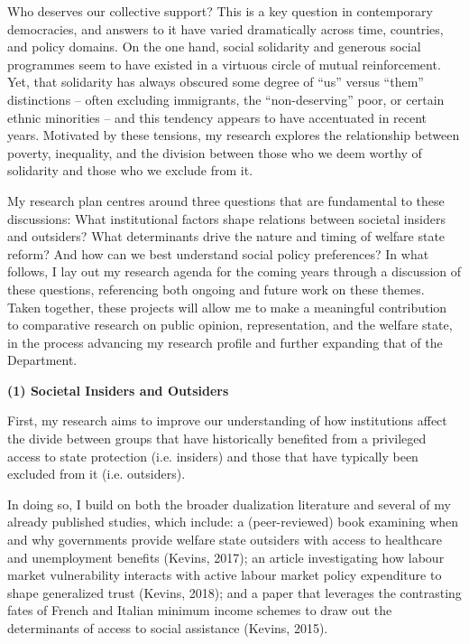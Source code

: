 \documentclass[letterpaper]{scrartcl}
\begin{document}
  \raggedbottom

  Who deserves our collective support? This is a key question in contemporary democracies, and answers to it have varied dramatically across time, countries, and policy domains. On the one hand, social solidarity and generous social programmes seem to have existed in a virtuous circle of mutual reinforcement. Yet, that solidarity has always obscured some degree of ``us'' versus ``them'' distinctions -- often excluding immigrants, the ``non-deserving'' poor, or certain ethnic minorities -- and this tendency appears to have accentuated in recent years. Motivated by these tensions, my research explores the relationship between poverty, inequality, and the division between those who we deem worthy of solidarity and those who we exclude from it.

  My research plan centres around three questions that are fundamental to these discussions: What institutional factors shape relations between societal insiders and outsiders? What determinants drive the nature and timing of welfare state reform? And how can we best understand social policy preferences? In what follows, I lay out my research agenda for the coming years through a discussion of these questions, referencing both ongoing and future work on these themes. Taken together, these projects will allow me to make a meaningful contribution to comparative research on public opinion, representation, and the welfare state, in the process advancing my research profile and further expanding that of the Department.

  \textbf{(1) Societal Insiders and Outsiders}
  \vspace{-1em}

  First, my research aims to improve our understanding of how institutions affect the divide between groups that have historically benefited from a privileged access to state protection (i.e. insiders) and those that have typically been excluded from it (i.e. outsiders).

  In doing so, I build on both the broader dualization literature and several of my already published studies, which include: a (peer-reviewed) book examining when and why governments provide welfare state outsiders with access to healthcare and unemployment benefits (Kevins, 2017); an article investigating how labour market vulnerability interacts with active labour market policy expenditure to shape generalized trust (Kevins, 2018); and a paper that leverages the contrasting fates of French and Italian minimum income schemes to draw out the determinants of access to social assistance (Kevins, 2015).
\end{document}
